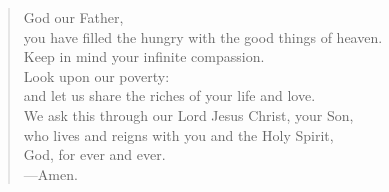 \prayer

\setlength{\vleftmargin}{\prayerleftmargini}

\begin{verse}
God our Father,\\
you have filled the hungry with the good things of heaven.\\
Keep in mind your infinite compassion.\\
Look upon our poverty:\\
and let us share the riches of your life and love.\\
We ask this through our Lord Jesus Christ, your Son,\\
who lives and reigns with you and the Holy Spirit,\\
God, for ever and ever.\\
{\color{red}---\thinspace}Amen.
\end{verse}

\setlength{\vleftmargin}{\defleftmargini}